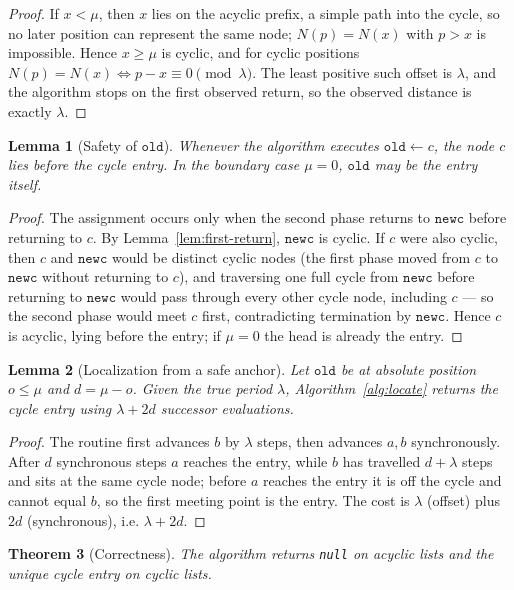 \documentclass[11pt]{article}
\newtheorem{theorem}{Theorem}[section]
\newtheorem{lemma}[theorem]{Lemma}
\newcommand{\nullnode}{\texttt{null}}
\newcommand{\oldc}{\texttt{old}}
\newcommand{\newc}{\texttt{newc}}
\begin{document}
\begin{proof}
If $x<\mu$, then $x$ lies on the acyclic prefix, a simple path into the cycle, so
no later position can represent the same node; $N(p)=N(x)$ with $p>x$ is
impossible. Hence $x\ge\mu$ is cyclic, and for cyclic positions
$N(p)=N(x)\iff p-x\equiv 0\pmod\lambda$. The least positive such offset is
$\lambda$, and the algorithm stops on the first observed return, so the observed
distance is exactly $\lambda$.
\end{proof}

\begin{lemma}[Safety of $\oldc$]
\label{lem:oldc}
Whenever the algorithm executes $\oldc\gets c$, the node $c$ lies before the cycle
entry. In the boundary case $\mu=0$, $\oldc$ may be the entry itself.
\end{lemma}

\begin{proof}
The assignment occurs only when the second phase returns to $\newc$ before
returning to $c$. By Lemma~\ref{lem:first-return}, $\newc$ is cyclic. If $c$ were
also cyclic, then $c$ and $\newc$ would be distinct cyclic nodes (the first phase
moved from $c$ to $\newc$ without returning to $c$), and traversing one full cycle
from $\newc$ before returning to $\newc$ would pass through every other cycle
node, including $c$ --- so the second phase would meet $c$ first, contradicting
termination by $\newc$. Hence $c$ is acyclic, lying before the entry; if $\mu=0$
the head is already the entry.
\end{proof}

\begin{lemma}[Localization from a safe anchor]
\label{lem:localization}
Let $\oldc$ be at absolute position $o\le\mu$ and $d=\mu-o$. Given the true period
$\lambda$, Algorithm~\ref{alg:locate} returns the cycle entry using $\lambda+2d$
successor evaluations.
\end{lemma}
\begin{proof}
The routine first advances $b$ by $\lambda$ steps, then advances $a,b$
synchronously. After $d$ synchronous steps $a$ reaches the entry, while $b$ has
travelled $d+\lambda$ steps and sits at the same cycle node; before $a$ reaches
the entry it is off the cycle and cannot equal $b$, so the first meeting point is
the entry. The cost is $\lambda$ (offset) plus $2d$ (synchronous), i.e.
$\lambda+2d$.
\end{proof}

\begin{theorem}[Correctness]
\label{thm:correctness}
The algorithm returns \nullnode{} on acyclic lists and the unique cycle entry on
cyclic lists.
\end{theorem}
\end{document}
